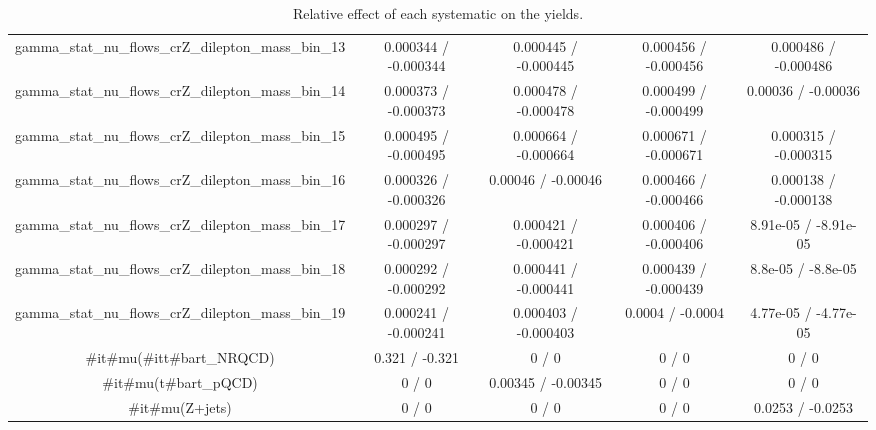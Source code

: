 \documentclass[10pt]{article}
\begin{document}
\begin{table}[htbp]
\begin{center}
\begin{tabular}{|c|c|c|c|c|}
  gamma_stat_nu_flows_crZ_dilepton_mass_bin_13 & 0.000344 / -0.000344 & 0.000445 / -0.000445 & 0.000456 / -0.000456 & 0.000486 / -0.000486 \\ 
  gamma_stat_nu_flows_crZ_dilepton_mass_bin_14 & 0.000373 / -0.000373 & 0.000478 / -0.000478 & 0.000499 / -0.000499 & 0.00036 / -0.00036 \\ 
  gamma_stat_nu_flows_crZ_dilepton_mass_bin_15 & 0.000495 / -0.000495 & 0.000664 / -0.000664 & 0.000671 / -0.000671 & 0.000315 / -0.000315 \\ 
  gamma_stat_nu_flows_crZ_dilepton_mass_bin_16 & 0.000326 / -0.000326 & 0.00046 / -0.00046 & 0.000466 / -0.000466 & 0.000138 / -0.000138 \\ 
  gamma_stat_nu_flows_crZ_dilepton_mass_bin_17 & 0.000297 / -0.000297 & 0.000421 / -0.000421 & 0.000406 / -0.000406 & 8.91e-05 / -8.91e-05 \\ 
  gamma_stat_nu_flows_crZ_dilepton_mass_bin_18 & 0.000292 / -0.000292 & 0.000441 / -0.000441 & 0.000439 / -0.000439 & 8.8e-05 / -8.8e-05 \\ 
  gamma_stat_nu_flows_crZ_dilepton_mass_bin_19 & 0.000241 / -0.000241 & 0.000403 / -0.000403 & 0.0004 / -0.0004 & 4.77e-05 / -4.77e-05 \\ 
  #it{#mu}(#it{t#bar{t}}_{NRQCD}) & 0.321 / -0.321 & 0 / 0 & 0 / 0 & 0 / 0 \\ 
  #it{#mu}(t#bar{t}_{pQCD}) & 0 / 0 & 0.00345 / -0.00345 & 0 / 0 & 0 / 0 \\ 
  #it{#mu}(Z+jets) & 0 / 0 & 0 / 0 & 0 / 0 & 0.0253 / -0.0253 \\ 
\hline 
\end{tabular} 
\caption{Relative effect of each systematic on the yields.} 
\end{center} 
\end{table} 
\end{document}
